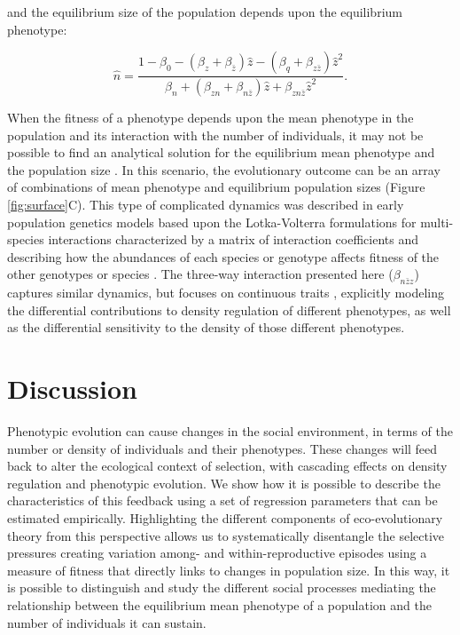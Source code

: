 \documentclass{article}
\begin{document}
\noindent and the equilibrium size of the population depends upon the equilibrium phenotype:

\begin{equation}  \label{eq: full}
	\hat{n} = \frac{1-\beta_{0}-(\beta_{z}  +  \beta_{\bar{z}})\hat{z} - (\beta_{q} + \beta_{z\bar{z}})\hat{z}^2 }{\beta_{n} + (\beta_{zn} + \beta_{n\bar{z}}) \hat{z} + \beta_{zn\bar{z}}\hat{z}^2}.
\end{equation}

When the fitness of a phenotype depends upon the mean phenotype in the population and its interaction with the number of individuals, it may not be possible to find an analytical solution for the equilibrium mean phenotype and the population size \citep{Engen2020}. In this scenario, the evolutionary outcome can be an array of combinations of mean phenotype and equilibrium population sizes (Figure \ref{fig:surface}C). This type of complicated dynamics was described in early population genetics models based upon the Lotka-Volterra formulations for multi-species interactions characterized by a matrix of interaction coefficients and describing how the abundances of each species or genotype affects fitness of the other genotypes or species \citep{Clarke1972, Anderson1983}. The three-way interaction presented here ($\beta_{n\bar{z}z}$) captures similar dynamics, but focuses on continuous traits \citep{Engen2020}, explicitly modeling the differential contributions to density regulation of different phenotypes, as well as the differential sensitivity to the density of those different phenotypes.   

\section{Discussion}
Phenotypic evolution can cause changes in the social environment, in terms of the number or density of individuals and their phenotypes. These changes will feed back to alter the ecological context of selection, with cascading effects on density regulation and phenotypic evolution. We show how it is possible to describe the characteristics of this feedback using a set of regression parameters that can be estimated empirically. Highlighting the different components of eco-evolutionary theory from this perspective allows us to systematically disentangle the selective pressures creating variation among- and within-reproductive episodes using a measure of fitness that directly links to changes in population size. In this way, it is possible to distinguish and study the different social processes mediating the relationship between the equilibrium mean phenotype of a population and the number of individuals it can sustain. 
\end{document}
